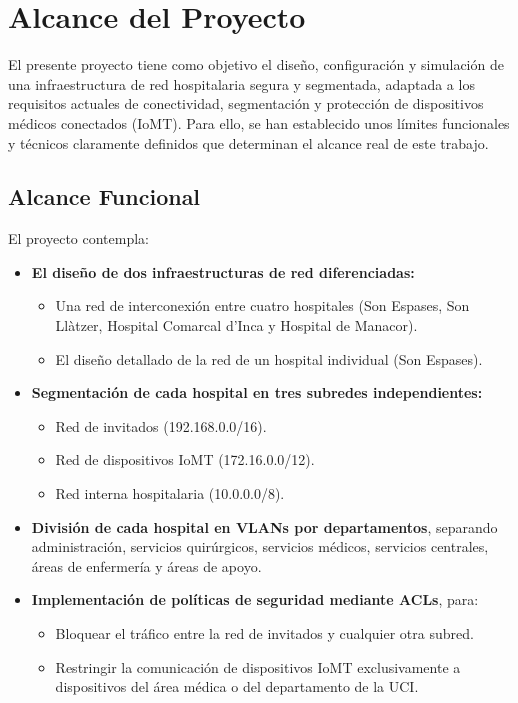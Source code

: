 \section{Alcance del Proyecto}
El presente proyecto tiene como objetivo el diseño, configuración y simulación de una infraestructura de red hospitalaria segura y segmentada, adaptada a los requisitos 
actuales de conectividad, segmentación y protección de dispositivos médicos conectados (IoMT). Para ello, se han establecido unos límites funcionales y técnicos claramente 
definidos que determinan el alcance real de este trabajo.

\subsection{Alcance Funcional}
El proyecto contempla:
\begin{itemize}
    \item \textbf{El diseño de dos infraestructuras de red diferenciadas:}
    \begin{itemize}
        \item Una red de interconexión entre cuatro hospitales (Son Espases, Son Llàtzer, Hospital Comarcal d'Inca y Hospital de Manacor).
        \item El diseño detallado de la red de un hospital individual (Son Espases).
    \end{itemize}
    \item \textbf{Segmentación de cada hospital en tres subredes independientes:}
    \begin{itemize}
        \item Red de invitados (192.168.0.0/16).
        \item Red de dispositivos \acs{IoMT} (172.16.0.0/12).
        \item Red interna hospitalaria (10.0.0.0/8).
    \end{itemize}
    \item \textbf{División de cada hospital en VLANs por departamentos}, separando administración, servicios quirúrgicos, servicios médicos, servicios centrales, áreas de enfermería y 
    áreas de apoyo.
    \item \textbf{Implementación de políticas de seguridad mediante ACLs}, para:
    \begin{itemize}
        \item Bloquear el tráfico entre la red de invitados y cualquier otra subred.
        \item Restringir la comunicación de dispositivos IoMT exclusivamente a dispositivos del área médica o del departamento de la \ac{UCI}.

\end{itemize}
\end{itemize}
